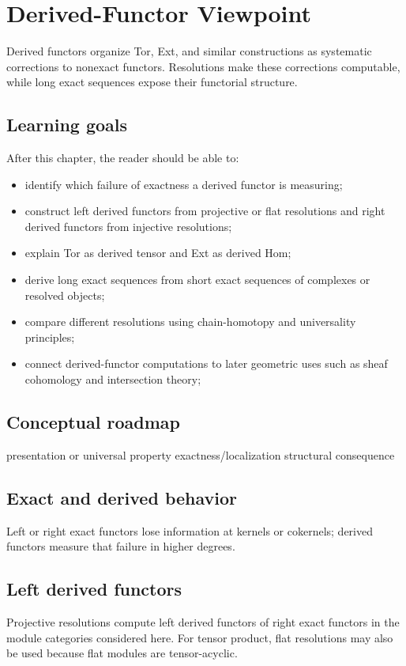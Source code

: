\chapter{Derived-Functor Viewpoint}
\label{ch:v28}

Derived functors organize Tor, Ext, and similar constructions as systematic corrections to nonexact functors. Resolutions make these corrections computable, while long exact sequences expose their functorial structure.

\section*{Learning goals}
After this chapter, the reader should be able to:
\begin{itemize}
\item identify which failure of exactness a derived functor is measuring;
\item construct left derived functors from projective or flat resolutions and right derived functors from injective resolutions;
\item explain Tor as derived tensor and Ext as derived Hom;
\item derive long exact sequences from short exact sequences of complexes or resolved objects;
\item compare different resolutions using chain-homotopy and universality principles;
\item connect derived-functor computations to later geometric uses such as sheaf cohomology and intersection theory;
\end{itemize}
\section*{Conceptual roadmap}
\volroadmap
  {presentation or universal property}
  {exactness/localization}
  {structural consequence}

\section{Exact and derived behavior}
Left or right exact functors lose information at kernels or cokernels; derived functors measure that failure in higher degrees.

\section{Left derived functors}
Projective resolutions compute left derived functors of right exact functors in the module categories considered here. For tensor product, flat resolutions may also be used because flat modules are tensor-acyclic.

